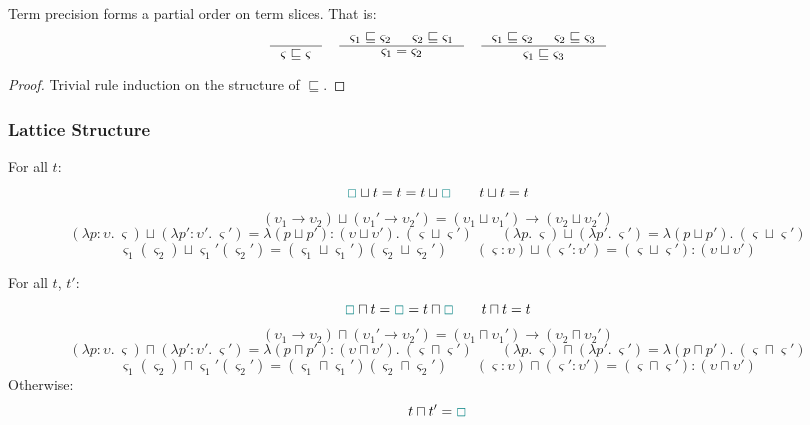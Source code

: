 \begin{proposition}
Term precision forms a partial order on term slices. That is:
\[\inference{}{\varsigma \sqsubseteq \varsigma} \quad \inference{\varsigma_1 \sqsubseteq \varsigma_2 & \varsigma_2 \sqsubseteq \varsigma_1}{\varsigma_1 = \varsigma_2} \quad \inference{\varsigma_1 \sqsubseteq \varsigma_2 & \varsigma_2 \sqsubseteq \varsigma_3}{\varsigma_1 \sqsubseteq \varsigma_3}\]
\end{proposition}
\begin{proof}
Trivial rule induction on the structure of $\sqsubseteq$.
\end{proof}

\subsubsection{Lattice Structure}
\begin{definition} For all $t$:
\[{\color{teal}\Box} \sqcup t = t = t \sqcup {\color{teal}\Box} \qquad t \sqcup t = t\]
\[(\upsilon_1 \to \upsilon_2) \sqcup (\upsilon_1' \to \upsilon_2') = (\upsilon_1 \sqcup \upsilon_1') \to (\upsilon_2 \sqcup \upsilon_2')\]
\[(\lambda p : \upsilon.\ \varsigma) \sqcup (\lambda p' : \upsilon'.\ \varsigma') = \lambda (p \sqcup p') : (\upsilon \sqcup \upsilon').\ (\varsigma \sqcup \varsigma') \qquad 
(\lambda p.\ \varsigma) \sqcup (\lambda p'.\ \varsigma') = \lambda (p \sqcup p').\ (\varsigma \sqcup \varsigma')\]
\[\varsigma_1(\varsigma_2) \sqcup \varsigma_1'(\varsigma_2') = (\varsigma_1 \sqcup \varsigma_1')(\varsigma_2 \sqcup \varsigma_2') \qquad (\varsigma : \upsilon) \sqcup (\varsigma' : \upsilon') = (\varsigma \sqcup \varsigma') : (\upsilon \sqcup \upsilon')\]
\end{definition}
\begin{definition} For all $t$, $t'$:
\[{\color{teal}\Box} \sqcap t = {\color{teal}\Box} = t \sqcap {\color{teal}\Box} \qquad t \sqcap t = t\]
\[(\upsilon_1 \to \upsilon_2) \sqcap (\upsilon_1' \to \upsilon_2') = (\upsilon_1 \sqcap \upsilon_1') \to (\upsilon_2 \sqcap \upsilon_2')\]
\[(\lambda p : \upsilon.\ \varsigma) \sqcap (\lambda p' : \upsilon'.\ \varsigma') = \lambda (p \sqcap p') : (\upsilon \sqcap \upsilon').\ (\varsigma \sqcap \varsigma') \qquad 
(\lambda p.\ \varsigma) \sqcap (\lambda p'.\ \varsigma') = \lambda (p \sqcap p').\ (\varsigma \sqcap \varsigma')\]
\[\varsigma_1(\varsigma_2) \sqcap \varsigma_1'(\varsigma_2') = (\varsigma_1 \sqcap \varsigma_1')(\varsigma_2 \sqcap \varsigma_2') \qquad (\varsigma : \upsilon) \sqcap (\varsigma' : \upsilon') = (\varsigma \sqcap \varsigma') : (\upsilon \sqcap \upsilon')\]
Otherwise:
\[t \sqcap t' = {\color{teal}\Box}\]
\end{definition}

